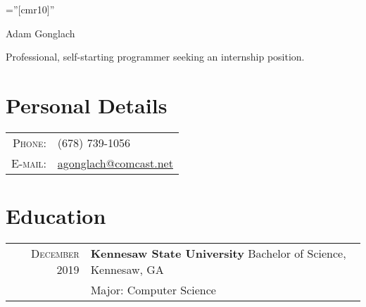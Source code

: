 \documentclass[a4paper,10pt]{article}
\begin{document}
\pagestyle{empty} 

\font\fb=''[cmr10]''

\par{\centering
		{\Huge Adam Gonglach
	}\bigskip\par}
	
	\begin{center}
	    Professional, self-starting programmer seeking an internship position.
	    \end{center}
\section{Personal Details}
\begin{tabular}{rl}
    \textsc{Phone:}     & (678) 739-1056\\
    \textsc{E-mail:}     & \href{mailto:agonglach@comcast.net}{agonglach@comcast.net}
\end{tabular}

\section{Education}
\begin{tabular}{rl}	
 \textsc{December 2019} &\textbf{Kennesaw State University} Bachelor of Science, Kennesaw, GA\\
&  Major: Computer Science\\
\end{tabular}

\end{document}
